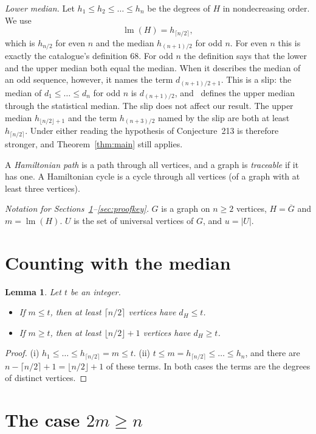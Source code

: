 \documentclass[11pt,a4paper]{article}
\newtheorem{lemma}[theorem]{Lemma}
\theoremstyle{remark}
\newcommand{\lm}{\operatorname{lm}}
\newcommand{\Gc}{\overline{G}}
\newcommand{\ceil}[1]{\lceil #1\rceil}
\newcommand{\flr}[1]{\lfloor #1\rfloor}
\begin{document}
\emph{Lower median.} Let $h_1\le h_2\le\dots\le h_n$ be the degrees of $H$ in nondecreasing
order. We use
\[
  \lm(H)=h_{\ceil{n/2}},
\]
which is $h_{n/2}$ for even $n$ and the median $h_{(n+1)/2}$ for odd $n$. For even $n$ this is
exactly the catalogue's definition 68. For odd $n$ the definition says that the lower and
the upper median both equal the median. When it describes the median of an odd sequence, however,
it names the term $d_{(n+1)/2+1}$. This is a slip: the median of $d_1\le\dots\le d_n$ for odd $n$
is $d_{(n+1)/2}$, and~\cite{dlpw} defines the upper median through the statistical median. The slip does not affect our
result. The upper median $h_{\flr{n/2}+1}$ and the term $h_{(n+3)/2}$ named by the slip are both
at least $h_{\ceil{n/2}}$. Under either reading the hypothesis of Conjecture~213 is therefore
stronger, and Theorem~\ref{thm:main} still applies.

A \emph{Hamiltonian path} is a path through all vertices, and a graph is \emph{traceable} if it
has one. A Hamiltonian cycle is a cycle through all vertices (of a graph with at least three
vertices).

\emph{Notation for Sections~\ref{sec:median}--\ref{sec:proofkey}.} $G$ is a graph on $n\ge 2$
vertices, $H=\Gc$ and $m=\lm(H)$. $U$ is the set of universal vertices of $G$, and $u=|U|$.

\section{Counting with the median}\label{sec:median}

\begin{lemma}\label{lem:median}
Let $t$ be an integer.
\begin{itemize}
\item[(i)] If $m\le t$, then at least $\ceil{n/2}$ vertices have $d_H\le t$.
\item[(ii)] If $m\ge t$, then at least $\flr{n/2}+1$ vertices have $d_H\ge t$.
\end{itemize}
\end{lemma}

\begin{proof}
(i) $h_1\le\dots\le h_{\ceil{n/2}}=m\le t$. (ii) $t\le m=h_{\ceil{n/2}}\le\dots\le h_n$, and
there are $n-\ceil{n/2}+1=\flr{n/2}+1$ of these terms. In both cases the terms are the degrees
of distinct vertices.
\end{proof}

\section{The case \texorpdfstring{$2m\ge n$}{2m >= n}}\label{sec:caseJ}
\end{document}
